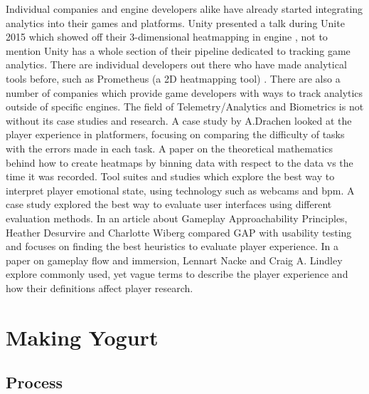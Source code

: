 \documentclass[journal]{IEEEtran}
\begin{document}
Individual companies and engine developers alike have already started integrating analytics into their games and platforms. Unity presented a talk during Unite 2015 which showed off their 3-dimensional heatmapping in engine \cite{unite2015}, not to mention Unity has a whole section of their pipeline dedicated to tracking game analytics. There are individual developers out there who have made analytical tools before, such as Prometheus (a 2D heatmapping tool) \cite{gibbs}. There are also a number of companies which provide game developers with ways to track analytics outside of specific engines. \cite{simpleusability} \cite{drachen} The field of Telemetry/Analytics and Biometrics is not without its case studies and research. A case study by A.Drachen looked at the player experience in platformers, focusing on comparing the difficulty of tasks with the errors made in each task. \cite{wehbe} A paper on the theoretical mathematics behind how to create heatmaps by binning data with respect to the data vs the time it was recorded. \cite{kumatani} Tool suites and studies which explore the best way to interpret player emotional state, using technology such as webcams and bpm. \cite{dingli} A case study explored the best way to evaluate user interfaces using different evaluation methods. \cite{nielsen} In an article about Gameplay Approachability Principles, Heather Desurvire and Charlotte Wiberg compared GAP with usability testing and focuses on finding the best heuristics to evaluate player experience. \cite{desurvire} In a paper on gameplay flow and immersion, Lennart Nacke and Craig A. Lindley explore commonly used, yet vague terms to describe the player experience and how their definitions affect player research. \cite{nacke}


\section{Making Yogurt}

\subsection{Process}
\end{document}

